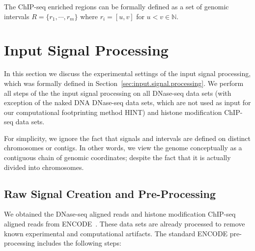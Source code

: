 The ChIP-seq enriched regions can be formally defined as a set of genomic intervals $R = \{ {r}_{1}, \cdots, {r}_{m} \}$ where ${r}_{i} = [u,v]$ for $u<v \in \mathbb{N}$.












\section{Input Signal Processing}
\label{sec:input.signal.processing.4}

In this section we discuss the experimental settings of the input signal processing, which was formally defined in Section~\ref{sec:input.signal.processing}. We perform all steps of the the input signal processing on all DNase-seq data sets (with exception of the naked DNA DNase-seq data sets, which are not used as input for our computational footprinting method HINT) and histone modification ChIP-seq data sets.

For simplicity, we ignore the fact that signals and intervals are defined on distinct chromosomes or contigs. In other words, we view the genome conceptually as a contiguous chain of genomic coordinates; despite the fact that it is actually divided into chromosomes.

\subsection{Raw Signal Creation and Pre-Processing}
\label{sec:raw.signal.creation.preprocessing}

We obtained the DNase-seq aligned reads and histone modification ChIP-seq aligned reads from ENCODE~\cite{encode2012}. These data sets are already processed to remove known experimental and computational artifacts. The standard ENCODE pre-processing includes the following steps:

